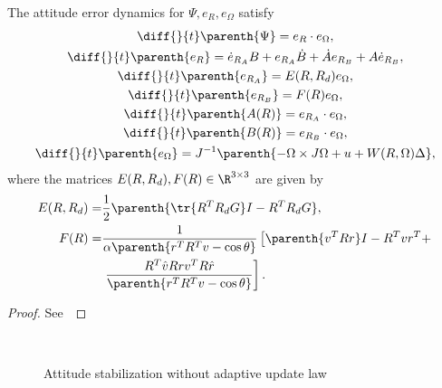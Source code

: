 \begin{prop}\label{prop:error_dyn}
	The attitude error dynamics for \( \Psi, e_R, e_\Omega \) satisfy 
	\begin{gather}
		\diff{}{t} \parenth{\Psi} = e_R \cdot e_\Omega , \label{eqn:psi_dot}\\
		\diff{}{t} \parenth{e_R} = \dot{e}_{R_A} B + e_{R_A} \dot{B} + \dot{A}e_{R_B} + A \dot{e}_{R_B} , \label{eqn:eR_dot} \\
		\diff{}{t} \parenth{e_{R_A}} = E(R, R_d) e_\Omega , \label{eqn:eRA_dot} \\
		\diff{}{t} \parenth{e_{R_B}} = F(R) e_\Omega , \label{eqn:eRB_dot} \\
    	\diff{}{t} \parenth{A(R)} = e_{R_A} \cdot e_\Omega , \label{eqn:A_dot} \\
		\diff{}{t} \parenth{B(R)} = e_{R_B} \cdot e_\Omega , \label{eqn:B_dot} \\
		\diff{}{t} \parenth{e_\Omega} = J^{-1} \parenth{-\Omega \times J \Omega + u + W(R, \Omega) \Delta} , \label{eqn:eW_dot}
	\end{gather}
	where the matrices \(E(R,R_d), F(R) \in \R^{3\times3} \) are given by
	\begin{align}
		E(R,R_d) = &\frac{1}{2} \parenth{\tr{R^T R_d G}I - R^T R_d G} , \label{eqn:E} \\
		F(R) = &\frac{1}{\alpha \parenth{r^T R^T v - \cos \theta}} \left[\parenth{v^T R r} I - R^T v r^T + \right. \nonumber \\
		& \left. \frac{R^T \hat{v} R r v^T R \hat{r}}{\parenth{r^T R^T v - \cos \theta}}\right] . \label{eqn:F}
	\end{align}
\end{prop}
\begin{proof}
See~
\end{proof}

\begin{figure}[t]
    \centering 
    ~
    ~
    \caption{Attitude stabilization without adaptive update law}
    \label{fig:con} 
\end{figure}
